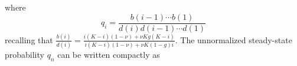 where
\begin{equation*}
q_i = \frac{b(i-1)\cdots b(1)}{d(i)d(i-1)\cdots d(1)}
\end{equation*}
recalling that $\frac{b(i)}{d(i)} = \frac{i(K-i)(1-\nu) + \nu Kg(K-i)}{i(K-i)(1-\nu) + \nu K(1-g)i}$.
%
The unnormalized steady-state probability $q_n$ can be written compactly as%
